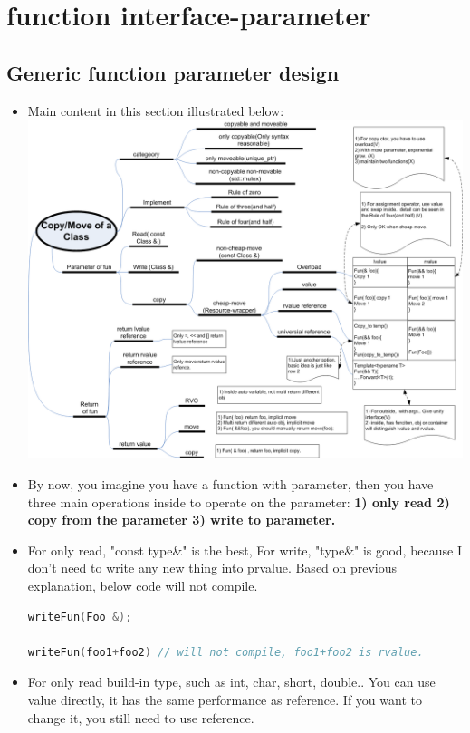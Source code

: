 \documentclass[a4paper,11pt,twoside]{book}
\begin{document}
\section{function interface-parameter}

\subsection{Generic function parameter design}
\begin{itemize}
\item Main content in this section illustrated below: \\
\includegraphics[scale=0.5]{pics/move.png}

\item  By now, you imagine you have a function with parameter, then you have three main operations inside to operate on the parameter: \textbf{1) only read 2) copy from the parameter 3) write to parameter.}

\item For only read, "const type\&" is the best, For write, "type\&" is good, because I don't need to write any new thing into prvalue. Based on previous explanation, below code will not compile. 
\begin{lstlisting}[frame=single, language=c++]
writeFun(Foo &);

writeFun(foo1+foo2) // will not compile, foo1+foo2 is rvalue.
\end{lstlisting}

\item For only read build-in type, such as int, char, short, double.. You can use value directly, it has the same performance as reference. If you want to change it, you still need to use reference.


\end{itemize}
\end{document}
